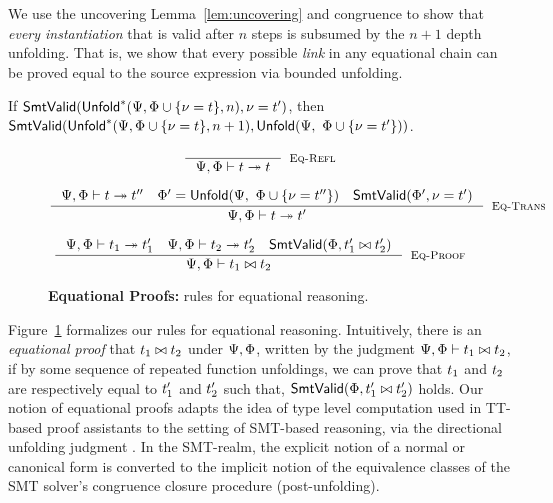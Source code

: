 %
We use the uncovering Lemma~\ref{lem:uncovering}
and congruence to show that \emph{every instantiation}
that is valid after $n$ steps is subsumed by the $n+1$
depth unfolding.
%
That is, we show that every possible \emph{link} in
any equational chain can be proved equal to
the source expression via bounded unfolding.

\begin{lemma} \label{lem:link}
If   $\mathsf{SmtValid}(\mathsf{Unfold}^{*}(\Psi,\Phi \cup \{ \nu = t \},n), \nu = t')$,
then $\mathsf{SmtValid}(\mathsf{Unfold}^{*}(\Psi,\Phi \cup \{ \nu = t \},n+1), \mathsf{Unfold}(\Psi,\ \Phi \cup \{ \nu = t' \}))$.
\end{lemma}


\begin{figure}[t]
$$
\inference{
}{
	\eqpf{\Renv}{\Penv}{\expr}{\expr}
}[\rulename{Eq-Refl}]
$$

$$\inference
  { \eqpf{\Renv}{\Penv}{\expr}{\expr''}
    \quad
    \Penv' = \uinst{\Renv}{\extendpenv{\Penv}{\vv = \expr''}}
    \quad
    \smtIsValid{\Penv'}{\vv = \expr'}
  }
  {\eqpf{\Renv}{\Penv}{\expr}{\expr'}}
 [\rulename{Eq-Trans}]
$$

$$\inference
  { \eqpf{\Renv}{\Penv}{\expr_1}{\expr_1'}
    \quad
		\eqpf{\Renv}{\Penv}{\expr_2}{\expr_2'}
		\quad
    \smtIsValid{\Penv}{\expr_1' \binop \expr_2'}
  }
  {\symeqpf{\Renv}{\Penv}{\expr_1}{\binop}{\expr_2}}
  [\rulename{Eq-Proof}]
$$
\caption{\textbf{Equational Proofs:} rules for equational reasoning.}
\label{fig:equational-proof}
\figrule
\end{figure}

%
Figure~\ref{fig:equational-proof} formalizes
our rules for equational reasoning.
%
Intuitively, there is an \emph{equational proof}
that $t_1 \bowtie t_2$ under $\Psi, \Phi$,
written by the judgment
%
$\Psi, \Phi \vdash t_1 \bowtie t_2$,
%
if by some sequence of repeated function unfoldings,
we can prove that $t_1$ and $t_2$ are
respectively equal to $t_1'$ and $t_2'$
such that,
%
$\mathsf{SmtValid}(\Phi, t_1' \bowtie t_2')$
%
holds.
%
Our notion of equational proofs
adapts the idea of type level
computation used in TT-based
proof assistants to the setting of
SMT-based reasoning, via the
directional unfolding judgment
.
%
In the SMT-realm, the explicit
notion of a normal or canonical
form is converted to the implicit
notion of the equivalence classes
of the SMT solver's congruence
closure procedure (post-unfolding).


